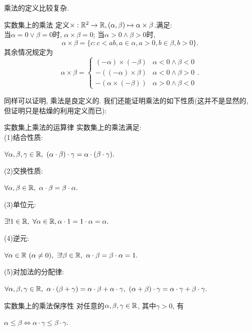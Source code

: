 乘法的定义比较复杂.

\begin{definition}{实数集上的乘法}
	定义$\times : \mathbb{R} ^2 \to \mathbb{R} , (\alpha , \beta) \mapsto \alpha \times \beta$.满足:  \\
	当$\alpha = 0 \vee \beta = 0$时, $\alpha \times \beta =0$; 当$\alpha >0 \wedge \beta >0$时, $$\alpha \times \beta = \{ c: c<ab, a \in \alpha , a>0, b \in \beta , b>0 \}.$$
	其余情况规定为$$\alpha \times \beta = \begin{cases}
		(-\alpha) \times (-\beta)  & \alpha < 0 \wedge \beta < 0 \\
		-((-\alpha) \times \beta)  & \alpha < 0 \wedge \beta > 0 \\
		-(\alpha \times (-\beta))  & \alpha > 0 \wedge \beta < 0
	\end{cases}.$$
\end{definition}

同样可以证明, 乘法是良定义的. 我们还能证明乘法的如下性质(这并不是显然的, 但证明只是枯燥的利用定义而已): 

\begin{proposition}{实数集上乘法的运算律}
	实数集上的乘法满足:  \\
	(1)结合性质: 
	\begin{center}
		$\forall \alpha , \beta , \gamma \in \mathbb{R} , ~(\alpha \cdot \beta ) \cdot \gamma = \alpha \cdot (\beta \cdot \gamma).$
	\end{center}
	(2)交换性质: 
	\begin{center}
		$\forall \alpha , \beta \in \mathbb{R}, ~\alpha \cdot \beta = \beta \cdot \alpha .$
	\end{center}
	(3)单位元: 
	\begin{center}
		$\exists ! 1 \in \mathbb{R} , ~\forall \alpha \in \mathbb{R} ,  \alpha \cdot 1 = 1 \cdot \alpha = \alpha .$
	\end{center}
	(4)逆元: 
	\begin{center}
		$\forall \alpha \in \mathbb{R}~(\alpha \neq 0) , ~\exists ! \beta \in \mathbb{R} , ~\alpha \cdot \beta = \beta \cdot \alpha = 1.$
	\end{center}
	(5)对加法的分配律: 
	\begin{center}
		$\forall \alpha , \beta , \gamma \in \mathbb{R} , ~\alpha \cdot (\beta + \gamma) = \alpha \cdot \beta + \alpha \cdot \gamma , ~ (\alpha + \beta) \cdot \gamma = \alpha \cdot \gamma + \beta \cdot \gamma . $
	\end{center}
\end{proposition}

\begin{proposition}{实数集上的乘法保序性}
	对任意的$\alpha , \beta , \gamma \in \mathbb{R}$, 其中$\gamma >0$, 有
	\begin{center}
		$\alpha \leq \beta \Leftrightarrow \alpha \cdot \gamma \leq \beta \cdot \gamma .$
	\end{center}
\end{proposition}

